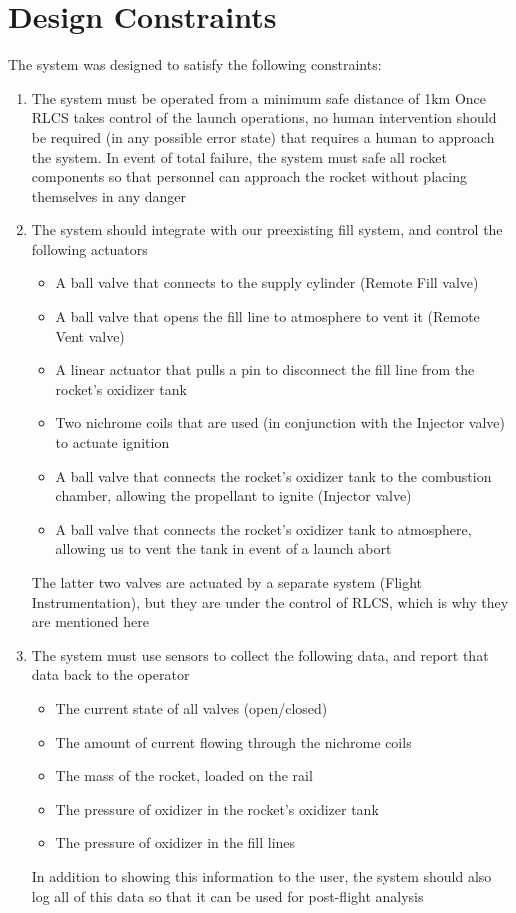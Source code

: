 \documentclass[letter]{article}
\begin{document}
\section{Design Constraints}
The system was designed to satisfy the following constraints:
\begin{enumerate}
    \item The system must be operated from a minimum safe distance of 1km
    Once RLCS takes control of the launch operations, no human intervention
    should be required (in any possible error state) that requires a human
    to approach the system. In event of total failure, the system must safe
    all rocket components so that personnel can approach the rocket without
    placing themselves in any danger
    \item The system should integrate with our preexisting fill system, and control the following actuators
    \begin{itemize}
        \item A ball valve that connects to the supply cylinder (Remote Fill valve)
        \item A ball valve that opens the fill line to atmosphere to vent it (Remote Vent valve)
        \item A linear actuator that pulls a pin to disconnect the fill line from the rocket's oxidizer tank
        \item Two nichrome coils that are used (in conjunction with the Injector valve) to actuate ignition
        \item A ball valve that connects the rocket's oxidizer tank to the combustion chamber,
           allowing the propellant to ignite (Injector valve)
        \item A ball valve that connects the rocket's oxidizer tank to atmosphere, allowing us to vent
           the tank in event of a launch abort
    \end{itemize}
    The latter two valves are actuated by a separate system (Flight Instrumentation), but they are
    under the control of RLCS, which is why they are mentioned here
    \item The system must use sensors to collect the following data, and report that data back to the operator
    \begin{itemize}
        \item The current state of all valves (open/closed)
        \item The amount of current flowing through the nichrome coils
        \item The mass of the rocket, loaded on the rail
        \item The pressure of oxidizer in the rocket's oxidizer tank
        \item The pressure of oxidizer in the fill lines
    \end{itemize}
    In addition to showing this information to the user, the system should also log all of this
    data so that it can be used for post-flight analysis
\end{enumerate}
\end{document}
